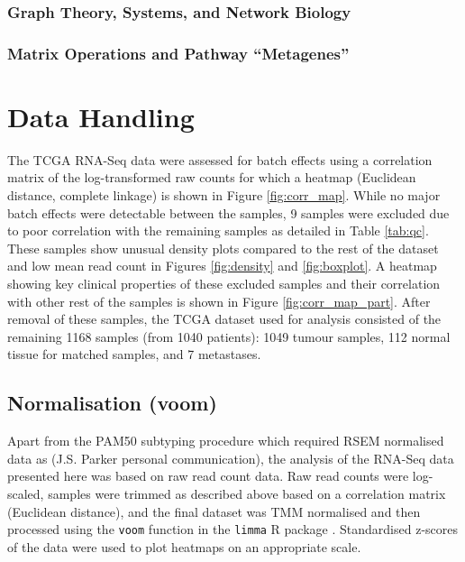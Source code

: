\subsubsection{Graph Theory, Systems, and Network Biology}
\subsubsection{Matrix Operations and Pathway “Metagenes”}
\section{Data Handling}

The TCGA RNA-Seq data were assessed for batch effects using a correlation matrix of the log-transformed raw counts for which a heatmap (Euclidean distance, complete linkage) is shown in Figure \ref{fig:corr_map}. While no major batch effects were detectable between the samples, 9 samples were excluded due to poor correlation with the remaining samples as detailed in Table \ref{tab:qc}. These samples show unusual density plots compared to the rest of the dataset and low mean read count in Figures \ref{fig:density} and \ref{fig:boxplot}. A heatmap showing key clinical properties of these excluded samples and their correlation with other rest of the samples is shown in Figure \ref{fig:corr_map_part}.
After removal of these samples, the TCGA dataset used for analysis consisted of the remaining 1168 samples (from 1040 patients): 1049 tumour samples, 112 normal tissue for matched samples, and 7 metastases.

\subsection{Normalisation (voom)}

Apart from the PAM50 subtyping procedure \cite{Parker2009} which required RSEM normalised data as (J.S. Parker personal communication), the analysis of the RNA-Seq data presented here was based on raw read count data. Raw read counts were log-scaled, samples were trimmed as described above based on a correlation matrix (Euclidean distance), and the final dataset was TMM normalised \cite{Robinson2010} and then processed using the \texttt{voom} function \cite{Law2014} in the \texttt{limma} R package \cite{limma}. Standardised z-scores of the data were used to plot heatmaps on an appropriate scale.


